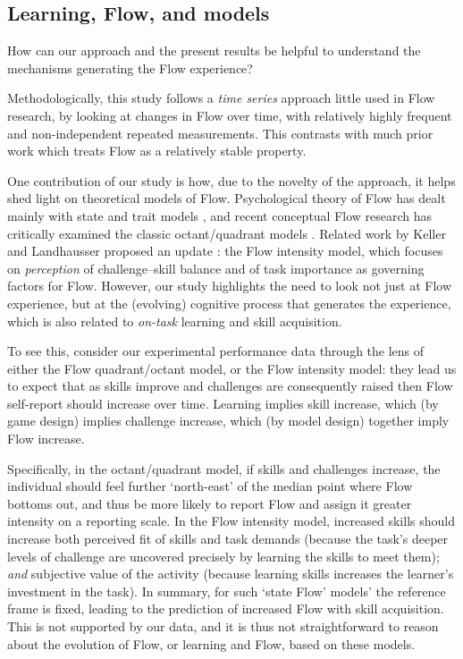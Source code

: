 \documentclass[fleqn,10pt]{wlscirep}
\begin{document}
\subsection*{Learning, Flow, and models}
How can our approach and the present results be helpful to understand the mechanisms generating the Flow experience?

Methodologically, this study follows a {\it time series} approach little used in Flow research, by looking at changes in Flow over time, with relatively highly frequent and non-independent repeated measurements. This contrasts with much prior work which treats Flow as a relatively stable property.

One contribution of our study is how, due to the novelty of the approach, it helps shed light on theoretical models of Flow. Psychological theory of Flow has dealt mainly with state and trait models \cite{Csikszentmihalyi1975}, and recent conceptual Flow research \cite{Moneta2012} has critically examined the classic octant/quadrant models \cite{Massimini1988}. Related work by Keller and Landhausser proposed an update \cite[pp-56]{Keller2012}: the Flow intensity model, which focuses on {\it perception} of challenge--skill balance and of task importance as governing factors for Flow. However, our study highlights the need to look not just at Flow experience, but at the (evolving) cognitive process that generates the experience, which is also related to {\it on-task} learning and skill acquisition.

To see this, consider our experimental performance data through the lens of either the Flow quadrant/octant model, or the Flow intensity model: they lead us to expect that as skills improve and challenges are consequently raised then Flow self-report should increase over time. Learning implies skill increase, which (by game design) implies challenge increase, which (by model design) together imply Flow increase.

Specifically, in the octant/quadrant model, if skills and challenges increase, the individual should feel further `north-east' of the median point where Flow bottoms out, and thus be more likely to report Flow and assign it greater intensity on a reporting scale. In the Flow intensity model, increased skills should increase both perceived fit of skills and task demands (because the task's deeper levels of challenge are uncovered precisely by learning the skills to meet them); {\it and} subjective value of the activity (because learning skills increases the learner's investment in the task). In summary, for such `state Flow' models' the reference frame is fixed, leading to the prediction of increased Flow with skill acquisition.
This is not supported by our data, and it is thus not straightforward to reason about the evolution of Flow, or learning and Flow, based on these models.
\end{document}
